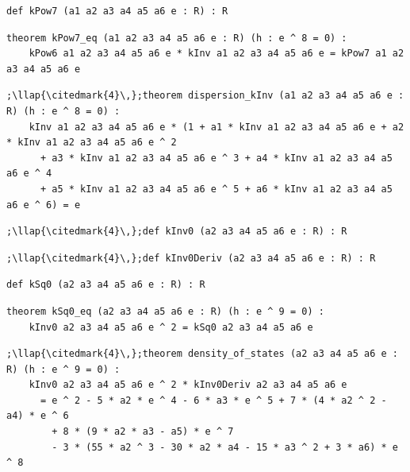 \begin{lstlisting}[style=leancat]
def kPow7 (a1 a2 a3 a4 a5 a6 e : R) : R
\end{lstlisting}

\begin{lstlisting}[style=leancat]
theorem kPow7_eq (a1 a2 a3 a4 a5 a6 e : R) (h : e ^ 8 = 0) :
    kPow6 a1 a2 a3 a4 a5 a6 e * kInv a1 a2 a3 a4 a5 a6 e = kPow7 a1 a2 a3 a4 a5 a6 e
\end{lstlisting}

\begin{lstlisting}[style=leancat]
;\llap{\citedmark{4}\,};theorem dispersion_kInv (a1 a2 a3 a4 a5 a6 e : R) (h : e ^ 8 = 0) :
    kInv a1 a2 a3 a4 a5 a6 e * (1 + a1 * kInv a1 a2 a3 a4 a5 a6 e + a2 * kInv a1 a2 a3 a4 a5 a6 e ^ 2
      + a3 * kInv a1 a2 a3 a4 a5 a6 e ^ 3 + a4 * kInv a1 a2 a3 a4 a5 a6 e ^ 4
      + a5 * kInv a1 a2 a3 a4 a5 a6 e ^ 5 + a6 * kInv a1 a2 a3 a4 a5 a6 e ^ 6) = e
\end{lstlisting}

\begin{lstlisting}[style=leancat]
;\llap{\citedmark{4}\,};def kInv0 (a2 a3 a4 a5 a6 e : R) : R
\end{lstlisting}

\begin{lstlisting}[style=leancat]
;\llap{\citedmark{4}\,};def kInv0Deriv (a2 a3 a4 a5 a6 e : R) : R
\end{lstlisting}

\begin{lstlisting}[style=leancat]
def kSq0 (a2 a3 a4 a5 a6 e : R) : R
\end{lstlisting}

\begin{lstlisting}[style=leancat]
theorem kSq0_eq (a2 a3 a4 a5 a6 e : R) (h : e ^ 9 = 0) :
    kInv0 a2 a3 a4 a5 a6 e ^ 2 = kSq0 a2 a3 a4 a5 a6 e
\end{lstlisting}

\begin{lstlisting}[style=leancat]
;\llap{\citedmark{4}\,};theorem density_of_states (a2 a3 a4 a5 a6 e : R) (h : e ^ 9 = 0) :
    kInv0 a2 a3 a4 a5 a6 e ^ 2 * kInv0Deriv a2 a3 a4 a5 a6 e
      = e ^ 2 - 5 * a2 * e ^ 4 - 6 * a3 * e ^ 5 + 7 * (4 * a2 ^ 2 - a4) * e ^ 6
        + 8 * (9 * a2 * a3 - a5) * e ^ 7
        - 3 * (55 * a2 ^ 3 - 30 * a2 * a4 - 15 * a3 ^ 2 + 3 * a6) * e ^ 8
\end{lstlisting}

